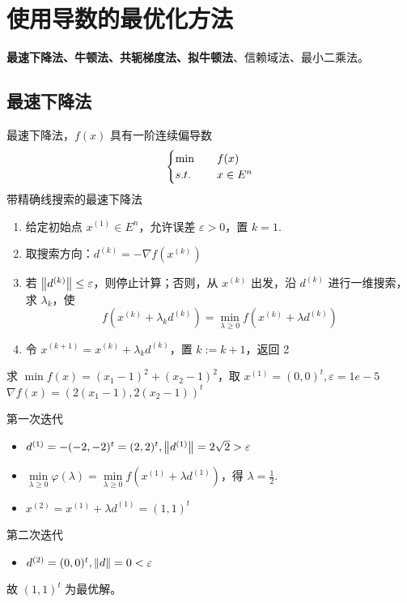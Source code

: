 \section{使用导数的最优化方法}
\textbf{最速下降法、牛顿法、共轭梯度法、拟牛顿法}、信赖域法、最小二乘法。

\subsection{最速下降法}
\begin{note}
    最速下降法，$f(x)$ 具有一阶连续偏导数 \[\begin{cases}
        \min \quad &f(x)\\
        s.t. \quad &x \in E^n
    \end{cases}\]
    带精确线搜索的最速下降法 \begin{enumerate}
        \item 给定初始点 $x^{(1)} \in E^n$，允许误差 $\varepsilon > 0$，置 $k = 1$.
        \item 取搜索方向：$d^{(k)} = -\nabla f(x^{(k)})$
        \item 若 $\norm{d^{(k)}} \le \varepsilon$，则停止计算；否则，从 $x^{(k)}$ 出发，沿 $d^{(k)}$ 进行一维搜索，求 $\lambda_k$，使 
        \[
            f(x^{(k)} + \lambda_k d^{(k)}) = \min_{\lambda \ge 0} f(x^{(k)} + \lambda d^{(k)})
        \]
        \item 令 $x^{(k + 1)} = x^{(k)} + \lambda_k d^{(k)}$，置 $k := k + 1$，返回 2
    \end{enumerate}
\end{note}

\begin{example}
    求 $\min f(x) = (x_1 - 1)^2 + (x_2 - 1)^2$，取 $x^{(1)} = (0, 0)^t, \varepsilon = 1e-5$
    \answer $\nabla f(x) = (2(x_1 - 1), 2(x_2 - 1))^t$

    第一次迭代\begin{itemize}
        \item $d^{(1)} = -(-2, -2)^t = (2, 2)^t, \norm{d^{(1)}} = 2\sqrt{2} > \varepsilon$
        \item $\underset{\lambda \ge 0}{\min} \varphi(\lambda) = \underset{\lambda \ge 0}{\min} f(x^{(1)} + \lambda d^{(1)})$，得 $\lambda = \frac{1}{2}$.
        \item $x^{(2)} = x^{(1)} + \lambda d^{(1)} = (1, 1)^t$
    \end{itemize}
    第二次迭代\begin{itemize}
        \item $d^{(2)} = (0, 0)^t, \norm{d} = 0 < \varepsilon$
    \end{itemize}
    故 $(1, 1)^t$ 为最优解。
\end{example}

